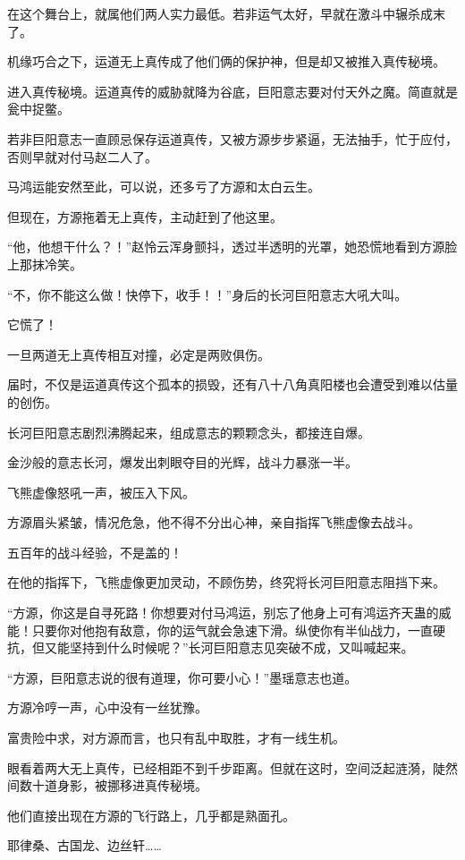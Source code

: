 \begin{this_body}
在这个舞台上，就属他们两人实力最低。若非运气太好，早就在激斗中辗杀成末了。

机缘巧合之下，运道无上真传成了他们俩的保护神，但是却又被推入真传秘境。

进入真传秘境。运道真传的威胁就降为谷底，巨阳意志要对付天外之魔。简直就是瓮中捉鳖。

若非巨阳意志一直顾忌保存运道真传，又被方源步步紧逼，无法抽手，忙于应付，否则早就对付马赵二人了。

马鸿运能安然至此，可以说，还多亏了方源和太白云生。

但现在，方源拖着无上真传，主动赶到了他这里。

“他，他想干什么？！”赵怜云浑身颤抖，透过半透明的光罩，她恐慌地看到方源脸上那抹冷笑。

“不，你不能这么做！快停下，收手！！”身后的长河巨阳意志大吼大叫。

它慌了！

一旦两道无上真传相互对撞，必定是两败俱伤。

届时，不仅是运道真传这个孤本的损毁，还有八十八角真阳楼也会遭受到难以估量的创伤。

长河巨阳意志剧烈沸腾起来，组成意志的颗颗念头，都接连自爆。

金沙般的意志长河，爆发出刺眼夺目的光辉，战斗力暴涨一半。

飞熊虚像怒吼一声，被压入下风。

方源眉头紧皱，情况危急，他不得不分出心神，亲自指挥飞熊虚像去战斗。

五百年的战斗经验，不是盖的！

在他的指挥下，飞熊虚像更加灵动，不顾伤势，终究将长河巨阳意志阻挡下来。

“方源，你这是自寻死路！你想要对付马鸿运，别忘了他身上可有鸿运齐天蛊的威能！只要你对他抱有敌意，你的运气就会急速下滑。纵使你有半仙战力，一直硬抗，但又能坚持到什么时候呢？”长河巨阳意志见突破不成，又叫喊起来。

“方源，巨阳意志说的很有道理，你可要小心！”墨瑶意志也道。

方源冷哼一声，心中没有一丝犹豫。

富贵险中求，对方源而言，也只有乱中取胜，才有一线生机。

眼看着两大无上真传，已经相距不到千步距离。但就在这时，空间泛起涟漪，陡然间数十道身影，被挪移进真传秘境。

他们直接出现在方源的飞行路上，几乎都是熟面孔。

耶律桑、古国龙、边丝轩……


\end{this_body}
